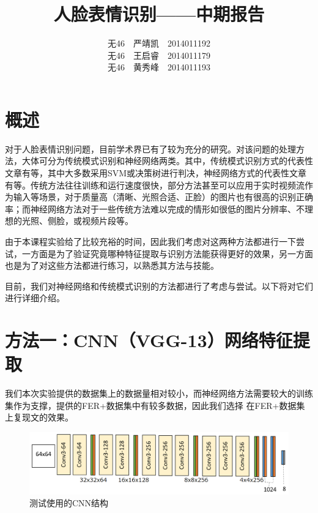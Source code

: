 \documentclass[UTF8]{ctexart}
\begin{document}
\title{人脸表情识别——中期报告}
\author{无46\ \ 严靖凯\ \ 2014011192\\ 无46\ \ 王启睿\ \ 2014011179\\ 无46\ \ 黄秀峰\ \ 2014011193}
\maketitle

\section{概述}

对于人脸表情识别问题，目前学术界已有了较为充分的研究。对该问题的处理方法，大体可分为传统模式识别和神经网络两类。其中，传统模式识别方式的代表性文章有\cite{happy2015automatic,islam2016sention,wang2013feature,salmam2016facial}等，其中大多数采用SVM或决策树进行判决，神经网络方式的代表性文章有\cite{BarsoumICMI2016,khorrami2015deep}等。传统方法往往训练和运行速度很快，部分方法甚至可以应用于实时视频流作为输入等场景，对于质量高（清晰、光照合适、正脸）的图片也有很高的识别正确率；而神经网络方法对于一些传统方法难以完成的情形如很低的图片分辨率、不理想的光照、侧脸，或视频片段等。

由于本课程实验给了比较充裕的时间，因此我们考虑对这两种方法都进行一下尝试，一方面是为了验证究竟哪种特征提取与识别方法能获得更好的效果，另一方面也是为了对这些方法都进行练习，以熟悉其方法与技能。

目前，我们对神经网络和传统模式识别的方法都进行了考虑与尝试。以下将对它们进行详细介绍。

\section{方法一：CNN（VGG-13）网络特征提取}

我们本次实验提供的数据集上的数据量相对较小，而神经网络方法需要较大的训练集作为支撑，\cite{BarsoumICMI2016}提供的FER+数据集中有较多数据，因此我们选择%
在FER+数据集上复现文\cite{BarsoumICMI2016}的效果。

\begin{figure}[ht]
\includegraphics[width=\textwidth]{ferplus.png}
\caption{测试使用的CNN结构}\label{fig:ferplus}
\end{figure}
\end{document}
